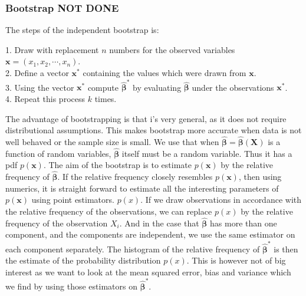 
\subsubsection{Bootstrap NOT DONE}
The steps of the independent bootstrap is:

\begin{mdframed}[backgroundcolor=black!10]
\raggedright
1. Draw with replacement $n$ numbers for the observed variables $\boldsymbol{x} = (x_1,x_2,\cdots,x_n)$. \\
2. Define a vector $\boldsymbol{x}^*$ containing the values which were drawn from $\boldsymbol{x}$. \\
3. Using the vector $\boldsymbol{x}^*$ compute $\boldsymbol{\hat\beta}^*$ by evaluating $\boldsymbol{\hat\beta}$ under the observations $\boldsymbol{x}^*$. \\
4. Repeat this process $k$ times. 
\end{mdframed}

The advantage of bootstrapping is that i's very general, as it does not require distributional assumptions. This makes bootstrap more accurate when data is not well behaved or the sample size is small. We use that when
 $\boldsymbol{\hat{\beta}}=\boldsymbol{\hat\beta}(\boldsymbol{X})$ is a function of random variables, $\boldsymbol{\hat\beta}$ itself must be a random variable. Thus it has
a pdf $p(\boldsymbol{x})$. The aim of the bootstrap is to
estimate $p(\boldsymbol{x})$ by the relative frequency of
$\boldsymbol{\hat\beta}$. If the relative frequency closely
resembles $p(\boldsymbol{x})$, then using numerics, it is straight forward to
estimate all the interesting parameters of $p(\boldsymbol{x})$ using point
estimators. $p(x)$. If we draw observations in accordance with
the relative frequency of the observations, we can replace $p(x)$ by the relative frequency of the observation $X_i$. And in the case that $\boldsymbol{\hat\beta}$ has
more than one component, and the components are independent, we use the
same estimator on each component separately. 
The histogram of the relative frequency of $\boldsymbol{\hat\beta}^*$ is then the estimate of the probability distribution $p(x)$. This is however not of big interest as we want to look at the mean squared error, bias and variance which we find by using those estimators on $\boldsymbol{\hat\beta}^*$.

